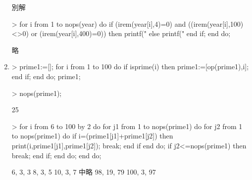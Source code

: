 \begin{enumerate}
別解
\begin{MapleInput}
> for i from 1 to nops(year) do 
    if (irem(year[i],4)=0) and ((irem(year[i],100)<>0) or (irem(year[i],400)=0)) then 
      printf("%
    else 
      printf("%
    end if;
  end do;
\end{MapleInput}
\begin{MapleError}
略
\end{MapleError}

\item
\begin{MapleInput}
> prime1:=[]; 
  for i from 1 to 100 do 
    if isprime(i) then 
      prime1:=[op(prime1),i];
    end if; 
  end do; 
  prime1;
\end{MapleInput}
\begin{MapleError}
[2, 3, 5, 7, 11, 13, 17, 19, 23, 29, 31, 37, 41, 43, 47, 53, 59, 61, 67, 71, 
73, 79, 83, 89, 97]
\end{MapleError}
\begin{MapleInput}
> nops(prime1);
\end{MapleInput}
\begin{MapleOutput}
25
\end{MapleOutput}

\begin{MapleInput}
> for i from 6 to 100 by 2 do 
    for j1 from 1 to nops(prime1) do 
      for j2 from 1 to nops(prime1) do 
        if i=(prime1[j1]+prime1[j2]) then
          print(i,prime1[j1],prime1[j2]); 
          break;
        end if 
      end do; 
      if j2<=nops(prime1) then
        break; 
      end if; 
    end do; 
  end do;
\end{MapleInput}
\begin{MapleError}
6, 3, 3
8, 3, 5
10, 3, 7
中略
98, 19, 79
100, 3, 97
\end{MapleError}
                                  
\end{enumerate}